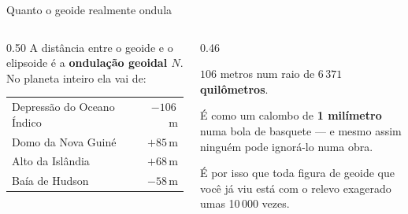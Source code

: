 \documentclass[aspectratio=169,11pt]{beamer}
\newcommand{\bnum}[1]{\textbf{\textcolor{mTeal}{#1}}}
\begin{document}
\begin{frame}{Quanto o geoide realmente ondula}
  \begin{columns}[T]
    \begin{column}{0.50\textwidth}
      A distância entre o geoide e o elipsoide é a \textcolor{mRose}{\textbf{ondulação
      geoidal $N$}}. No planeta inteiro ela vai de:
      \medskip
      \centering
      \small
      \renewcommand{\arraystretch}{1.25}
      \begin{tabular}{lr}
        \toprule
        Depressão do Oceano Índico & $-106$\,m \\
        Domo da Nova Guiné & $+85$\,m \\
        Alto da Islândia & $+68$\,m \\
        Baía de Hudson & $-58$\,m \\
        \bottomrule
      \end{tabular}
    \end{column}
    \begin{column}{0.46\textwidth}
      \begin{cuidado}[title={Parece muito? É pouquíssimo.}]
        $106$ metros num raio de $6\,371$\,\textbf{quilômetros}.
        \medskip

        É como um calombo de \bnum{1 milímetro} numa bola de basquete --- e mesmo assim
        ninguém pode ignorá-lo numa obra.
      \end{cuidado}
      \medskip

      {\small É por isso que toda figura de geoide que você já viu está com o relevo
      exagerado umas 10\,000 vezes.}
    \end{column}
  \end{columns}
\end{frame}
\end{document}
